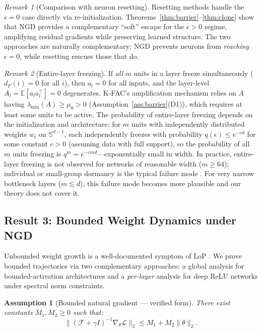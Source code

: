 \documentclass{article}
\providecommand{\E}{\mathbb{E}}
\providecommand{\FIM}{\mathcal{F}}
\providecommand{\norm}[1]{\lVert #1 \rVert}
\theoremstyle{plain}
\newtheorem{assumption}{Assumption}
\theoremstyle{definition}
\theoremstyle{remark}
\newtheorem{remark}{Remark}
\begin{document}
\begin{remark}[Comparison with neuron resetting]
Resetting methods \citep{sokar2023dormant, farias2025snr} handle the $\epsilon = 0$ case directly via re-initialization. Theorems~\ref{thm:barrier}--\ref{thm:clone} show that NGD provides a complementary ``soft'' escape for the $\epsilon > 0$ regime, amplifying residual gradients while preserving learned structure. The two approaches are naturally complementary: NGD prevents neurons from \emph{reaching} $\epsilon = 0$, while resetting rescues those that do.
\end{remark}

\begin{remark}[Entire-layer freezing]
\label{rem:layer_freeze}
If \emph{all} $m$ units in a layer freeze simultaneously ($d_F(i) = 0$ for all $i$), then $a_l = 0$ for all inputs, and the layer-level $A_l = \E[a_l a_l^\top] = 0$ degenerates. K-FAC's amplification mechanism relies on $A$ having $\lambda_{\min}(A) \geq \mu_0 > 0$ (Assumption~\ref{ass:barrier}(D1)), which requires at least some units to be active. The probability of entire-layer freezing depends on the initialization and architecture: for $m$ units with independently distributed weights $w_i$ on $\mathbb{S}^{d-1}$, each independently freezes with probability $q(\epsilon) \leq e^{-c d}$ for some constant $c > 0$ (assuming data with full support), so the probability of all $m$ units freezing is $q^m = e^{-cmd}$---exponentially small in width. In practice, entire-layer freezing is not observed for networks of reasonable width ($m \geq 64$); individual or small-group dormancy is the typical failure mode \citep{sokar2023dormant}. For very narrow bottleneck layers ($m \lesssim d$), this failure mode becomes more plausible and our theory does not cover it.
\end{remark}

\subsection{Result 3: Bounded Weight Dynamics under NGD}
\label{sec:bounded}

Unbounded weight growth is a well-documented symptom of LoP \citep{dohare2024loss, wu2026rank}. We prove bounded trajectories via two complementary approaches: a global analysis for bounded-activation architectures and a \emph{per-layer} analysis for deep ReLU networks under spectral norm constraints.

\begin{assumption}[Bounded natural gradient --- verified form]
\label{ass:bounded_ng}
There exist constants $M_1, M_2 \geq 0$ such that:
\begin{equation}
    \norm{(\FIM + \gamma I)^{-1}\nabla_\theta \mathcal{L}}_2 \leq M_1 + M_2 \norm{\theta}_2.
\end{equation}
\end{assumption}
\end{document}
